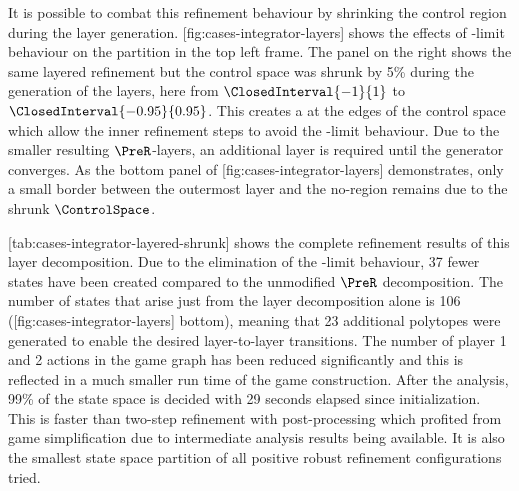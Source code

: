 
    It is possible to combat this refinement behaviour by shrinking the control region during the layer generation.
    [fig:cases-integrator-layers] shows the effects of \epsilon-limit behaviour on the partition in the top left frame.
    The panel on the right shows the same layered refinement but the control space was shrunk by 5\% during the generation of the layers, here from $\ClosedInterval{-1}{1}$ to $\ClosedInterval{-0.95}{0.95}$.
    This creates a  at the edges of the control space which allow the inner refinement steps to avoid the \epsilon-limit behaviour.
    Due to the smaller resulting $\PreR$-layers, an additional layer is required until the generator converges.
    As the bottom panel of [fig:cases-integrator-layers] demonstrates, only a small border between the outermost layer and the no-region remains due to the shrunk $\ControlSpace$.

    [tab:cases-integrator-layered-shrunk] shows the complete refinement results of this layer decomposition.
    Due to the elimination of the \epsilon-limit behaviour, 37 fewer states have been created compared to the unmodified $\PreR$ decomposition.
    The number of states that arise just from the layer decomposition alone is 106 ([fig:cases-integrator-layers] bottom), meaning that 23 additional polytopes were generated to enable the desired layer-to-layer transitions.
    The number of player 1 and 2 actions in the game graph has been reduced significantly and this is reflected in a much smaller run time of the game construction.
    After the analysis, 99\% of the state space is decided with 29 seconds elapsed since initialization.
    This is faster than two-step refinement with post-processing which profited from game simplification due to intermediate analysis results being available.
    It is also the smallest state space partition of all positive robust refinement configurations tried.

